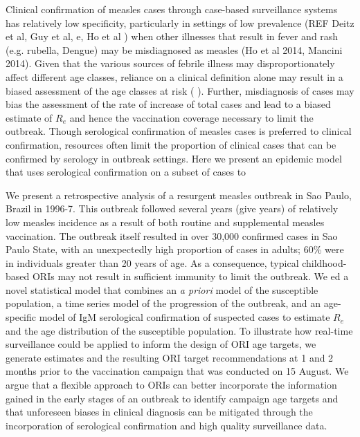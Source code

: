 Clinical confirmation of measles cases through case-based surveillance systems has relatively low specificity,
particularly in settings of low prevalence (REF Deitz et al, Guy et al,
e\cite{Hutchins_2004}, Ho et al ) when other illnesses that result in fever and
rash (e.g. rubella, Dengue) may be misdiagnosed as measles (Ho et al 2014,
Mancini 2014). Given that the various sources of febrile illness may
disproportionately affect different age classes, reliance on a clinical
definition alone may result in a biased assessment of the age classes at
risk (\cite{Hutchins_2004}\cite{Hutchins_2004} \cite{Durrheim_2014}). Further, misdiagnosis of
cases may bias the assessment of the rate of increase of total cases and
lead to a biased estimate of \(R_{e}\) and hence the vaccination
coverage necessary to limit the outbreak. Though serological
confirmation of measles cases is preferred to clinical confirmation,
resources often limit the proportion of clinical cases that can be
confirmed by serology in outbreak settings. Here we present an epidemic
model that uses serological confirmation on a subset of cases to

We present a retrospective analysis of a resurgent measles outbreak in
Sao Paulo, Brazil in 1996-7. This outbreak followed several years (give years) of
relatively low measles incidence as a result of both routine and
supplemental measles vaccination. The outbreak itself resulted in over
30,000 confirmed cases in Sao Paulo State, with an unexpectedly high
proportion of cases in adults; 60\% were in individuals greater than 20
years of age. As a consequence, typical childhood-based ORIs may not result in sufficient immunity to limit the outbreak. We
ed a novel statistical model that combines an \emph{a priori} model
of the susceptible population, a time series model of the progression of
the outbreak, and an age-specific model of IgM serological confirmation
of suspected cases to estimate \(R_{e}\)and the age distribution of the
susceptible population. To illustrate how real-time surveillance could
be applied to inform the design of ORI age targets, we generate
estimates and the resulting ORI target recommendations at 1
and 2 months prior to the vaccination campaign that was
conducted on 15 August. We argue that a flexible approach to ORIs can
better incorporate the information gained in the early stages of an
outbreak to identify campaign age targets and that unforeseen biases in
clinical diagnosis can be mitigated through the incorporation of
serological confirmation and high quality surveillance data.